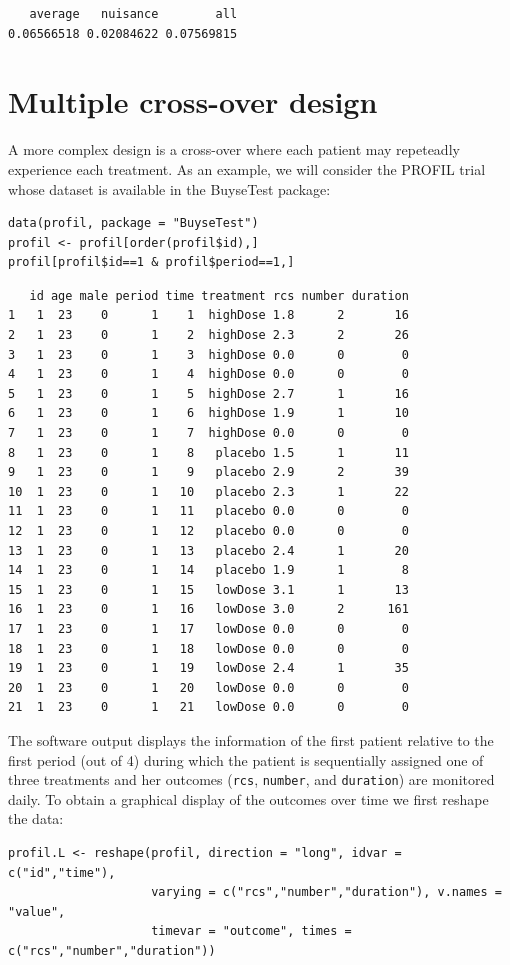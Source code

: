 \documentclass[12pt]{article}
\begin{document}
\begin{verbatim}
   average   nuisance        all 
0.06566518 0.02084622 0.07569815
\end{verbatim}


\clearpage

\section{Multiple cross-over design}
\label{sec:org5972858}
A more complex design is a cross-over where each patient may
repeteadly experience each treatment. As an example, we will consider
the PROFIL trial whose dataset is available in the BuyseTest package:
\lstset{language=r,label= ,caption= ,captionpos=b,numbers=none}
\begin{lstlisting}
data(profil, package = "BuyseTest")
profil <- profil[order(profil$id),]
profil[profil$id==1 & profil$period==1,]
\end{lstlisting}

\begin{verbatim}
   id age male period time treatment rcs number duration
1   1  23    0      1    1  highDose 1.8      2       16
2   1  23    0      1    2  highDose 2.3      2       26
3   1  23    0      1    3  highDose 0.0      0        0
4   1  23    0      1    4  highDose 0.0      0        0
5   1  23    0      1    5  highDose 2.7      1       16
6   1  23    0      1    6  highDose 1.9      1       10
7   1  23    0      1    7  highDose 0.0      0        0
8   1  23    0      1    8   placebo 1.5      1       11
9   1  23    0      1    9   placebo 2.9      2       39
10  1  23    0      1   10   placebo 2.3      1       22
11  1  23    0      1   11   placebo 0.0      0        0
12  1  23    0      1   12   placebo 0.0      0        0
13  1  23    0      1   13   placebo 2.4      1       20
14  1  23    0      1   14   placebo 1.9      1        8
15  1  23    0      1   15   lowDose 3.1      1       13
16  1  23    0      1   16   lowDose 3.0      2      161
17  1  23    0      1   17   lowDose 0.0      0        0
18  1  23    0      1   18   lowDose 0.0      0        0
19  1  23    0      1   19   lowDose 2.4      1       35
20  1  23    0      1   20   lowDose 0.0      0        0
21  1  23    0      1   21   lowDose 0.0      0        0
\end{verbatim}

The software output displays the information of the first patient
relative to the first period (out of 4) during which the patient is
sequentially assigned one of three treatments and her outcomes (\texttt{rcs},
\texttt{number}, and \texttt{duration}) are monitored daily. To obtain a graphical
display of the outcomes over time we first reshape the data:
\lstset{language=r,label= ,caption= ,captionpos=b,numbers=none}
\begin{lstlisting}
profil.L <- reshape(profil, direction = "long", idvar = c("id","time"),
                    varying = c("rcs","number","duration"), v.names = "value",
                    timevar = "outcome", times = c("rcs","number","duration"))
\end{lstlisting}
\end{document}
